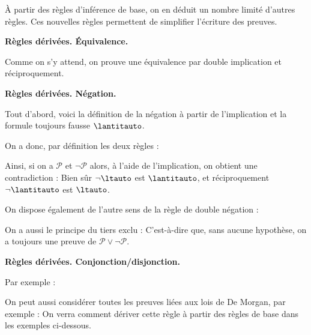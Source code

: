 \documentclass[11pt,class=report,crop=false]{standalone}
\begin{document}
À partir des règles d'inférence de base, on en déduit un nombre limité d'autres règles. Ces nouvelles règles permettent de simplifier l'écriture des preuves. 


\bigskip
\textbf{Règles dérivées. Équivalence.} 

Comme on s'y attend, on prouve une équivalence par double implication et réciproquement.
	

	


\bigskip
\textbf{Règles dérivées. Négation.}

Tout d'abord, voici la définition de la négation à partir de l'implication et la formule toujours fausse $\lantitauto$.
\mybox{$
\lnot \mathcal{P} \ \text{ est défini par } \  \mathcal{P} \limplies \lantitauto
$}

On a donc, par définition les deux règles :

Ainsi, si on a $\mathcal{P}$ et $\lnot \mathcal{P}$ alors, à l'aide de l'implication, on obtient une contradiction  :
Bien sûr $\lnot \ltauto$ est $\lantitauto$,  et réciproquement $\lnot \lantitauto$ est $\ltauto$.

On dispose également de l'autre sens de la règle de double négation :

On a aussi le principe du tiers exclu :
C'est-à-dire que, sans aucune hypothèse, on a toujours une preuve de $\mathcal{P} \lor \lnot \mathcal{P}$.

\bigskip
\textbf{Règles dérivées. Conjonction/disjonction.}

Par exemple :
	
On peut aussi considérer toutes les preuves liées aux lois de De Morgan, par exemple :
On verra comment dériver cette règle à partir des règles de base dans les exemples ci-dessous.
\end{document}
